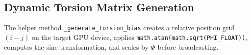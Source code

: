 \subsection{Dynamic Torsion Matrix Generation}
The helper method \texttt{\_generate\_torsion\_bias} creates a relative position grid $(i - j)$ on the target GPU device, applies \texttt{math.atan(math.sqrt(PHI\_FLOAT))}, computes the sine transformation, and scales by $\Phi$ before broadcasting.